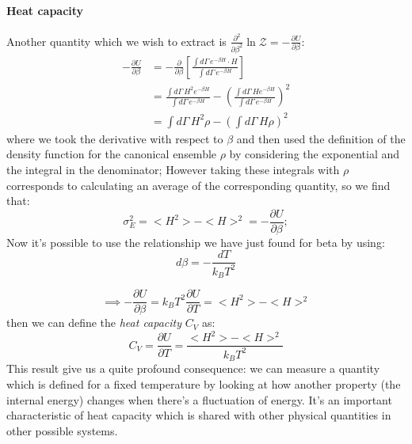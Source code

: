 \paragraph*{Heat capacity}
Another quantity which we wish to extract is $\frac{\partial^2}{\partial \beta^2}\ln{\mathcal{Z}}=-\frac{\partial U}{\partial \beta}$:
\begin{equation*}
\begin{split}
    -\frac{\partial U}{\partial\beta} & = -\frac{\partial}{\partial\beta}\left[\frac{\int d\Gamma\, e^{-\beta H}\cdot H}{\int d\Gamma\, e^{-\beta H}}\right] \\
    & =\frac{\int d\Gamma\, H^2 e^{-\beta H}}{\int d\Gamma\, e^{-\beta H}}-\left(\frac{\int d\Gamma\, H e^{-\beta H}}{\int d\Gamma\, e^{-\beta H}} \right)^2 \\
    & = \int d\Gamma\, H^2\rho-\left(\int d\Gamma\, H\rho\right)^2
\end{split}
\end{equation*}
where we took the derivative with respect to $\beta$ and then used the definition of the density function for the canonical ensemble $\rho$ by considering the exponential and the integral in the denominator; However taking these integrals with $\rho$ corresponds to calculating an average of the corresponding quantity, so we find that:
\begin{equation}
    \sigma^2_E=<H^2>-<H>^2=-\frac{\partial U}{\partial\beta};
\end{equation}
Now it's possible to use the relationship we have just found for beta by using:
\begin{equation*}
        d\beta=-\frac{dT}{k_B T^2}
\end{equation*}

\begin{equation*}
        \implies -\frac{\partial U}{\partial\beta}= k_B T^2\frac{\partial U}{\partial T}=<H^2>-<H>^2
\end{equation*}
then we can define the \textit{heat capacity} $C_V$ as:
\begin{equation}
    C_V=\frac{\partial U}{\partial T}=\frac{<H^2>-<H>^2}{k_B T^2}
\end{equation}
This result give us a quite profound consequence: we can measure a quantity which is defined for a fixed temperature by looking at how another property (the internal energy) changes when there's a fluctuation of energy. It's an important characteristic of heat capacity which is shared with other physical quantities in other possible systems. 

